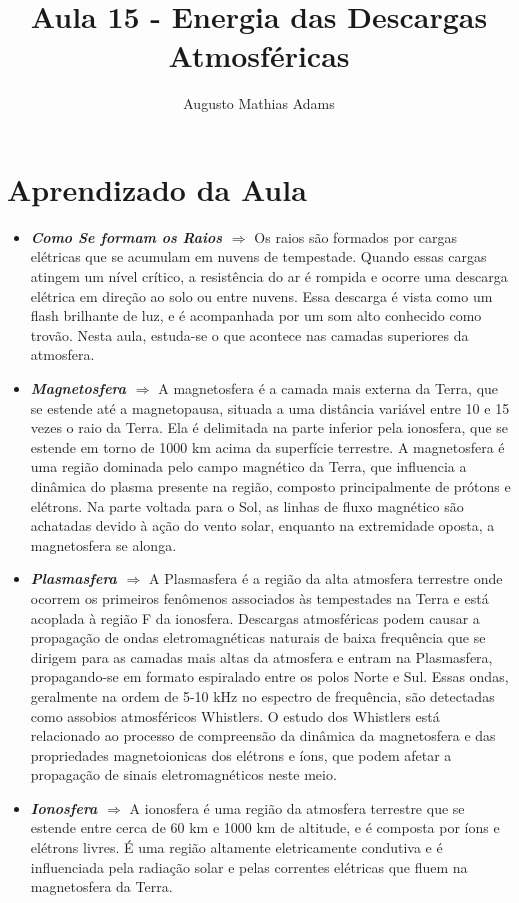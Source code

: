\documentclass[a4paper, 12pt, onecolumn,singlespacing]{article}
\title{Aula 15 - Energia das Descargas Atmosféricas}
\author[1]{Augusto Mathias Adams}
\affil[1]{augusto.adams@ufpr.br}
\begin{document}
	
	\maketitle
	
	\section{Aprendizado da Aula}
	
	\begin{itemize}
		\item \textbf{\textit{Como Se formam os Raios $\Rightarrow$ }} Os raios são formados por cargas elétricas que se acumulam em nuvens de tempestade. Quando essas cargas atingem um nível crítico, a resistência do ar é rompida e ocorre uma descarga elétrica em direção ao solo ou entre nuvens. Essa descarga é vista como um flash brilhante de luz, e é acompanhada por um som alto conhecido como trovão. Nesta aula, estuda-se o que acontece nas camadas superiores da atmosfera.
		\item \textbf{\textit{Magnetosfera $\Rightarrow$ }}A magnetosfera é a camada mais externa da Terra, que se estende até a magnetopausa, situada a uma distância variável entre 10 e 15 vezes o raio da Terra. Ela é delimitada na parte inferior pela ionosfera, que se estende em torno de 1000 km acima da superfície terrestre. A magnetosfera é uma região dominada pelo campo magnético da Terra, que influencia a dinâmica do plasma presente na região, composto principalmente de prótons e elétrons. Na parte voltada para o Sol, as linhas de fluxo magnético são achatadas devido à ação do vento solar, enquanto na extremidade oposta, a magnetosfera se alonga.
		\item \textbf{\textit{Plasmasfera $\Rightarrow$ }} A Plasmasfera é a região da alta atmosfera terrestre onde ocorrem os primeiros fenômenos associados às tempestades na Terra e está acoplada à região F da ionosfera. Descargas atmosféricas podem causar a propagação de ondas eletromagnéticas naturais de baixa frequência que se dirigem para as camadas mais altas da atmosfera e entram na Plasmasfera, propagando-se em formato espiralado entre os polos Norte e Sul. Essas ondas, geralmente na ordem de 5-10 kHz no espectro de frequência, são detectadas como assobios atmosféricos Whistlers. O estudo dos Whistlers está relacionado ao processo de compreensão da dinâmica da magnetosfera e das propriedades magnetoionicas dos elétrons e íons, que podem afetar a propagação de sinais eletromagnéticos neste meio.
		\item \textbf{\textit{Ionosfera $\Rightarrow$ }}A ionosfera é uma região da atmosfera terrestre que se estende entre cerca de 60 km e 1000 km de altitude, e é composta por íons e elétrons livres. É uma região altamente eletricamente condutiva e é influenciada pela radiação solar e pelas correntes elétricas que fluem na magnetosfera da Terra.
		

\end{itemize}
\end{document}

